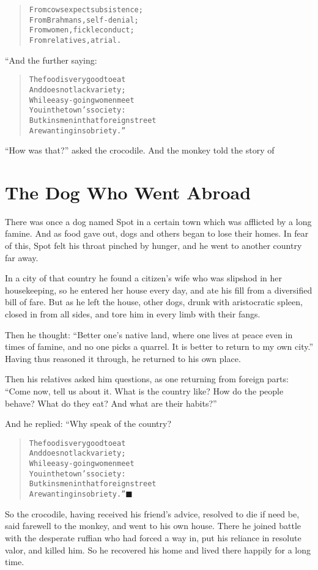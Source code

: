 \documentclass[article, twoside, 14pt]{memoir}
\newcommand{\qed}{\hfill \ensuremath{\blacksquare}}
\renewenvironment{verbatim}{%
\begin{quote}%
\vskip -10pt%
\begin{alltt}\normalfont\large}{\end{alltt}%
\end{quote}%
\vskip -10pt
} %
\begin{document}
\begin{verbatim}
From cows expect subsistence;
    From Brahmans, self-denial;
From women, fickle conduct;
    From relatives, a trial.
\end{verbatim}
“And the further saying:

\begin{verbatim}
The food is very good to eat
    And does not lack variety;
While easy-going women meet
    You in the town's society:
But kinsmen in that foreign street
    Are wanting in sobriety.”
\end{verbatim}
``How was that?'' asked the crocodile. And the monkey told the
story of

\chapter{The Dog Who Went Abroad}

\label{s77}

There was once a dog named Spot in a certain town which was
afflicted by a long famine. And as food gave out, dogs and others
began to lose their homes. In fear of this, Spot felt his throat
pinched by hunger, and he went to another country far away.

In a city of that country he found a citizen's wife who was
slipshod in her housekeeping, so he entered her house every day,
and ate his fill from a diversified bill of fare. But as he left
the house, other dogs, drunk with aristocratic spleen, closed in
from all sides, and tore him in every limb with their fangs.

Then he thought:
``Better one's native land, where one lives at peace even in times of famine, and no one picks a quarrel. It is better to return to my own city.''
Having thus reasoned it through, he returned to his own place.

Then his relatives asked him questions, as one returning from
foreign parts:
``Come now, tell us about it. What is the country like? How do the people behave? What do they eat? And what are their habits?''

And he replied: “Why speak of the country?

\begin{verbatim}
The food is very good to eat
    And does not lack variety;
While easy-going women meet
    You in the town's society:
But kinsmen in that foreign street
    Are wanting in sobriety.”\hyperref[s77]{\qed}
\end{verbatim}
So the crocodile, having received his friend's advice,
resolved to die if need be, said farewell to the monkey, and went
to his own house. There he joined battle with the desperate ruffian
who had forced a way in, put his reliance in resolute valor, and
killed him. So he recovered his home and lived there happily for a
long time.
\end{document}
